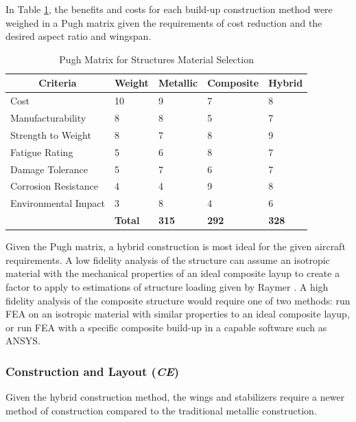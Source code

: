 \FloatBarrier
In Table \ref{tab:pugh_structures}, the benefits and costs for each build-up construction method were weighed in a Pugh matrix given the requirements of cost reduction and the desired aspect ratio and wingspan.

\begin{table}[!h]
\centering
\caption{Pugh Matrix for Structures Material Selection}
\begin{tabular}{|p{3.5cm}||p{2cm}|p{2cm}|p{2cm}|p{2cm}| }
\toprule
\multicolumn{1}{|c||}{\textbf{Criteria}} & \multicolumn{1}{c|}{\textbf{Weight}} &  
\multicolumn{1}{c|}{\textbf{Metallic}} & \multicolumn{1}{c|}{\textbf{Composite}} & \multicolumn{1}{c|}{\textbf{Hybrid}} \\ \hline \hline 
Cost & 10 & 9 & 7 & 8 \\ \hline
Manufacturability & 8 & 8 & 5 & 7 \\  \hline
Strength to Weight & 8 & 7 & 8 & 9 \\  \hline
Fatigue Rating & 5 & 6 & 8 & 7 \\  \hline
Damage Tolerance & 5 & 7 & 6 & 7 \\  \hline
Corrosion Resistance & 4 & 4 & 9 & 8 \\  \hline
Environmental Impact & 3 & 8 & 4 & 6 \\  \hline \hline
 & \textbf{Total} & \textbf{315} & \textbf{292} & \textbf{328} \\
\bottomrule
\end{tabular}
\label{tab:pugh_structures}
\end{table}
\FloatBarrier

Given the Pugh matrix, a hybrid construction is most ideal for the given aircraft requirements. A low fidelity analysis of the structure can assume an isotropic material with the mechanical properties of an ideal composite layup to create a factor to apply to estimations of structure loading given by Raymer \cite{raymer}. A high fidelity analysis of the composite structure would require one of two methods: run FEA on an isotropic material with similar properties to an ideal composite layup, or run FEA with a specific composite build-up in a capable software such as ANSYS.

\subsubsection{Construction and Layout (\textit{CE})}
Given the hybrid construction method, the wings and stabilizers require a newer method of construction compared to the traditional metallic construction. 

